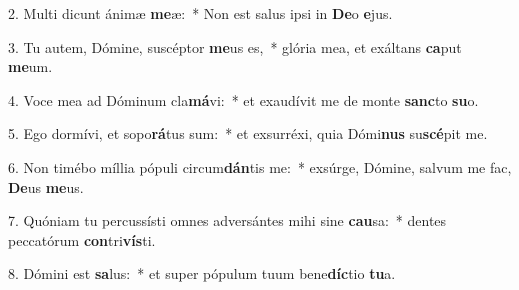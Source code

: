 2. Multi dicunt ánimæ \textbf{me}æ:~*  Non est salus ipsi in \textbf{De}o \textbf{e}jus.\

3. Tu autem, Dómine, suscéptor \textbf{me}us es,~*  glória mea, et exáltans \textbf{ca}put \textbf{me}um.\

4. Voce mea ad Dóminum cla\textbf{má}vi:~*  et exaudívit me de monte \textbf{sanc}to \textbf{su}o.\

5. Ego dormívi, et sopo\textbf{rá}tus sum:~*  et exsurréxi, quia Dómi\textbf{nus} su\textbf{scé}pit me.\

6. Non timébo míllia pópuli circum\textbf{dán}tis me:~*  exsúrge, Dómine, salvum me fac, \textbf{De}us \textbf{me}us.\

7. Quóniam tu percussísti omnes adversántes mihi sine \textbf{cau}sa:~*  dentes peccatórum \textbf{con}tri\textbf{vís}ti.\

8. Dómini est \textbf{sa}lus:~*  et super pópulum tuum bene\textbf{díc}tio \textbf{tu}a.\

